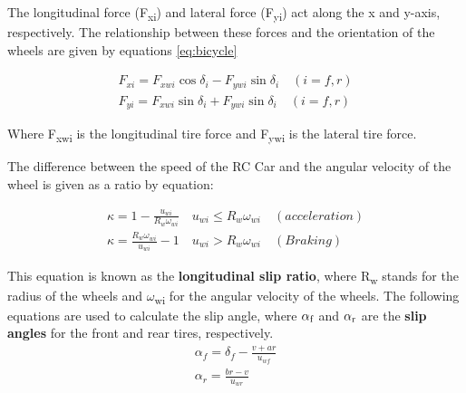 The longitudinal force (F\textsubscript{xi}) and lateral force (F\textsubscript{yi}) act along the x and y-axis, respectively. The relationship between these forces and the orientation of the wheels are given by equations \ref{eq:bicycle}

\begin{subequations}\label{eq:bicycle}
\begin{align}
	F_{xi} = F_{xwi}\cos\delta_{i}-F_{ywi}\sin\delta_{i} \quad (i=f,r)\\
	F_{yi} = F_{xwi}\sin\delta_{i}+F_{ywi}\sin\delta_{i} \quad (i=f,r)
	\end{align}
\end{subequations}

Where F\textsubscript{xwi} is the longitudinal tire force and F\textsubscript{ywi} is the lateral tire force. 

The difference between the speed of the RC Car and the angular velocity of the wheel is given as a ratio by equation:

\begin{subequations}
\begin{align}
	\kappa =1-\frac{u_{wi}}{R_{w}\omega_{wi}} \quad u_{wi}\leq  R_{w}\omega_{wi} \quad (acceleration)\\
	\kappa = \frac{R_{w}\omega_{wi}}{u_{wi}} -1 \quad u_{wi}> R_{w}\omega_{wi} \quad (Braking)
	\label{eq:kappa}
\end{align}
\end{subequations}

This equation is known as the \textbf{longitudinal slip ratio}, where R\textsubscript{w} stands for the radius of the wheels and $\omega$\textsubscript{wi} for the angular velocity of the wheels. The following equations are used to calculate the  slip angle, where $\alpha\textsubscript{f}$ and $\alpha\textsubscript{r}$ are the \textbf{slip angles} for the front and rear tires, respectively. 
\begin{subequations}
\begin{align}
    \label{eq:alpha1}
	\alpha_{f} = \delta_{f}-\frac{v+ar}{u_{wf}}\\
	\alpha_{r} = \frac{br-v}{u_{wr}}
	\label{eq:alpha2}
\end{align}
\end{subequations}



